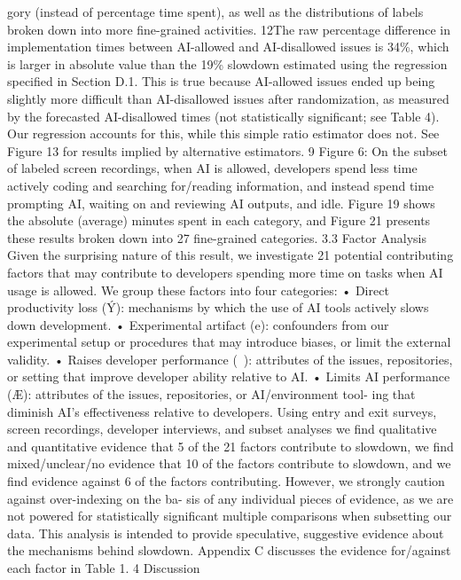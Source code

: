 gory (instead of percentage time spent), as well as the distributions of labels broken down into more
fine-grained activities.
12The raw percentage difference in implementation times between AI-allowed and AI-disallowed issues is
34\%, which is larger in absolute value than the 19\% slowdown estimated using the regression specified in
Section D.1. This is true because AI-allowed issues ended up being slightly more difficult than AI-disallowed
issues after randomization, as measured by the forecasted AI-disallowed times (not statistically significant; see
Table 4). Our regression accounts for this, while this simple ratio estimator does not. See Figure 13 for results
implied by alternative estimators.
9
Figure 6: On the subset of labeled screen recordings, when AI is allowed, developers spend less
time actively coding and searching for/reading information, and instead spend time prompting AI,
waiting on and reviewing AI outputs, and idle. Figure 19 shows the absolute (average) minutes spent
in each category, and Figure 21 presents these results broken down into 27 fine-grained categories.
3.3
Factor Analysis
Given the surprising nature of this result, we investigate 21 potential contributing factors that may
contribute to developers spending more time on tasks when AI usage is allowed. We group these
factors into four categories:
• Direct productivity loss (Ý): mechanisms by which the use of AI tools actively slows
down development.
• Experimental artifact (e): confounders from our experimental setup or procedures that
may introduce biases, or limit the external validity.
• Raises developer performance ( ): attributes of the issues, repositories, or setting that
improve developer ability relative to AI.
• Limits AI performance (Æ): attributes of the issues, repositories, or AI/environment tool-
ing that diminish AI’s effectiveness relative to developers.
Using entry and exit surveys, screen recordings, developer interviews, and subset analyses we
find qualitative and quantitative evidence that 5 of the 21 factors contribute to slowdown, we find
mixed/unclear/no evidence that 10 of the factors contribute to slowdown, and we find evidence
against 6 of the factors contributing. However, we strongly caution against over-indexing on the ba-
sis of any individual pieces of evidence, as we are not powered for statistically significant multiple
comparisons when subsetting our data. This analysis is intended to provide speculative, suggestive
evidence about the mechanisms behind slowdown. Appendix C discusses the evidence for/against
each factor in Table 1.
4
Discussion
